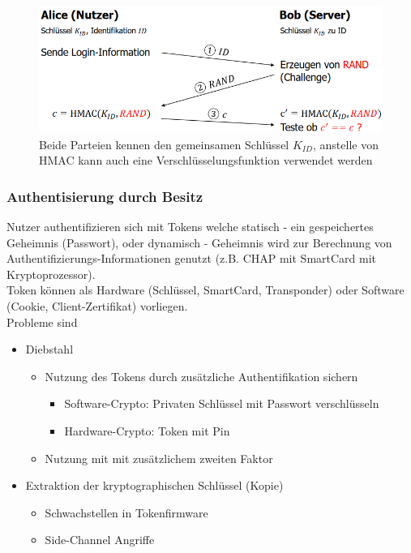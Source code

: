 \documentclass[a4paper,12pt,leqno]{article}
\begin{document}
\begin{figure}[h!]
\centering
\label{figure:CHAP}
\includegraphics[scale=0.7]{Grafiken/Callenge-Response-Verfahren.png}
\caption{Beide Parteien kennen den gemeinsamen Schlüssel $K_{ID}$, anstelle von HMAC kann auch eine Verschlüsselungsfunktion verwendet werden}
\end{figure}

\subsubsection{Authentisierung durch Besitz}

Nutzer authentifizieren sich mit Tokens welche statisch - ein gespeichertes Geheimnis (Passwort), oder dynamisch - Geheimnis wird zur Berechnung von Authentifizierungs-Informationen genutzt (z.B. CHAP mit SmartCard mit Kryptoprozessor).\\
Token können als Hardware (Schlüssel, SmartCard, Transponder) oder Software (Cookie, Client-Zertifikat) vorliegen.\\

Probleme sind
\begin{itemize}
\item Diebstahl
	\begin{itemize}
	\item Nutzung des Tokens durch zusätzliche Authentifikation sichern
		\begin{itemize}
		\item Software-Crypto: Privaten Schlüssel mit Passwort verschlüsseln
		\item Hardware-Crypto: Token mit Pin
		\end{itemize}
	\item Nutzung mit mit zusätzlichem zweiten Faktor
	\end{itemize}
\item Extraktion der kryptographischen Schlüssel (Kopie)
	\begin{itemize}
	\item Schwachstellen in Tokenfirmware
	\item Side-Channel Angriffe
	\end{itemize}
\end{itemize}
\end{document}
